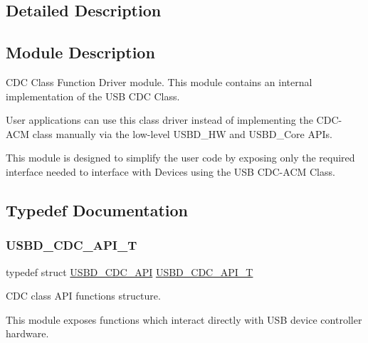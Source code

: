 \subsection{Detailed Description}
\hypertarget{group___u_s_b_d___c_d_c_Sec_CDCModDescription}{}\subsection{Module Description}\label{group___u_s_b_d___c_d_c_Sec_CDCModDescription}
C\+DC Class Function Driver module. This module contains an internal implementation of the U\+SB C\+DC Class.

User applications can use this class driver instead of implementing the C\+D\+C-\/\+A\+CM class manually via the low-\/level U\+S\+B\+D\+\_\+\+HW and U\+S\+B\+D\+\_\+\+Core A\+P\+Is.

This module is designed to simplify the user code by exposing only the required interface needed to interface with Devices using the U\+SB C\+D\+C-\/\+A\+CM Class. 

\subsection{Typedef Documentation}
\mbox{\label{group___u_s_b_d___c_d_c_gaad7f61aed01ad4130bee0f50b17eb716}} 
\subsubsection{\texorpdfstring{U\+S\+B\+D\+\_\+\+C\+D\+C\+\_\+\+A\+P\+I\+\_\+T}{USBD\_CDC\_API\_T}}
{\footnotesize\ttfamily typedef struct \hyperlink{struct_u_s_b_d___c_d_c___a_p_i}{U\+S\+B\+D\+\_\+\+C\+D\+C\+\_\+\+A\+PI}  \hyperlink{group___u_s_b_d___c_d_c_gaad7f61aed01ad4130bee0f50b17eb716}{U\+S\+B\+D\+\_\+\+C\+D\+C\+\_\+\+A\+P\+I\+\_\+T}}



C\+DC class A\+PI functions structure.

This module exposes functions which interact directly with U\+SB device controller hardware. 

